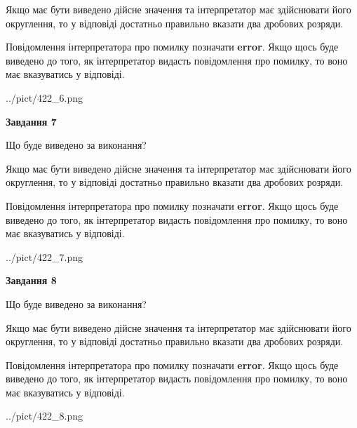 \documentclass[12pt, ukrainian]{article}
\begin{document}
{\begin {Large}
Якщо має бути виведено дійсне значення та інтерпретатор має здійснювати його округлення, 
то у відповіді достатньо правильно вказати два дробових розряди.

Повідомлення інтерпретатора про помилку позначати \textbf{error}.
Якщо щось буде виведено до того, як інтерпретатор видасть повідомлення про помилку, 
то воно має вказуватись у відповіді. \par

\begin{center}
	{../pict/422_6.png}
\end{center}
\newpage

{\begin {center}\textbf{Завдання 7}\end {center}}\par
Що буде виведено за виконання? \par

Якщо має бути виведено дійсне значення та інтерпретатор має здійснювати його округлення, 
то у відповіді достатньо правильно вказати два дробових розряди.

Повідомлення інтерпретатора про помилку позначати \textbf{error}.
Якщо щось буде виведено до того, як інтерпретатор видасть повідомлення про помилку, 
то воно має вказуватись у відповіді. \par

\begin{center}
	{../pict/422_7.png}
\end{center}
\newpage

{\begin {center}\textbf{Завдання 8}\end {center}}\par
Що буде виведено за виконання? \par

Якщо має бути виведено дійсне значення та інтерпретатор має здійснювати його округлення, 
то у відповіді достатньо правильно вказати два дробових розряди.

Повідомлення інтерпретатора про помилку позначати \textbf{error}.
Якщо щось буде виведено до того, як інтерпретатор видасть повідомлення про помилку, 
то воно має вказуватись у відповіді. \par

\begin{center}
	{../pict/422_8.png}
\end{center}
\newpage


\end{Large}}
\end{document}
